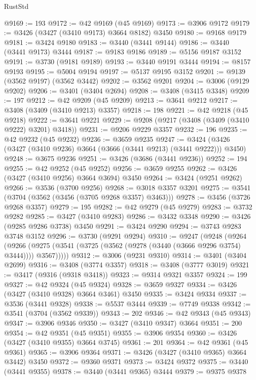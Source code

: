 \begin{lexlean}{RustStd}
\begin{coremodule}
@9169 := 193
@9172 := @42 @9169 (@45 @9169)
@9173 := @3906 @9172
@9179 := @3426 (@3427 (@3410 @9173) @3664 @8182) @3450
@9180 := @9168 @9179
@9181 := @3424 @9180
@9183 := @3440 (@3441 @9144)
@9186 := @3440 (@3441 @9173) @3444
@9187 := @9183 @9186
@9189 := @5156 @9187 @3152
@9191 := @3730 (@9181 @9189)
@9193 := @3440 @9191 @3444
@9194 := @8157 @9193
@9195 := @5004 @9194
@9197 := @5137 @9195 @3152
@9201 := @9139 (@3562 @9197) (@3562 @3442)
@9202 := @3562 @9201
@9204 := @3006 (@9129 @9202)
@9206 := @3401 (@3404 @2694)
@9208 := @3408 (@3415 @3348)
@9209 := 197
@9212 := @42 @9209 (@45 @9209)
@9213 := @3641 @9212
@9217 := @3408 (@3409 (@3410 @9213) @3357)
@9218 := 198
@9221 := @42 @9218 (@45 @9218)
@9222 := @3641 @9221
@9229 := @9208 (@9217 (@3408 (@3409 (@3410 @9222) @3201) @3418))
@9231 := @9206 @9229 @3357
@9232 := 196
@9235 := @42 @9232 (@45 @9232)
@9236 := @3659 @9235
@9247 := @3424 (@3426 (@3427 (@3410 @9236) @3664 (@3666 (@3441 @9213) (@3441 @9222))) @3450)
@9248 := @3675 @9236
@9251 := @3426 (@3686 (@3441 @9236))
@9252 := 194
@9255 := @42 @9252 (@45 @9252)
@9256 := @3659 @9255
@9262 := @3426 (@3427 (@3410 @9256) @3664 @3694) @3450
@9264 := @3424 (@9251 @9262)
@9266 := @3536 (@3700 @9256)
@9268 := @3018 @3357 @3201
@9275 := @3541 (@3704 (@3562 (@3456 (@3705 @9268 @3357) @3463)))
@9278 := @3456 (@3726 @9268 @3357)
@9279 := 195
@9282 := @42 @9279 (@45 @9279)
@9283 := @3732 @9282
@9285 := @3427 (@3410 @9283)
@9286 := @3432 @3348
@9290 := @3426 (@9285 @9286 @3738) @3450
@9291 := @3424 @9290
@9294 := @3743 @9283 @3748 @3152
@9296 := @3730 (@9291 @9294)
@9310 := @9247
    (@9248
      (@9264
        (@9266 (@9275 (@3541 (@3725 (@3562 (@9278 (@3440 (@3666 @9296 @3754) @3444)))) @3567)))))
@9312 := @3006 (@9231 @9310)
@9314 := @3401 (@3404 @2699)
@9316 := @3408 (@3774 @3357)
@9318 := @3408 (@3777 @3019)
@9321 := @3417 (@9316 (@9318 @3418))
@9323 := @9314 @9321 @3357
@9324 := 199
@9327 := @42 @9324 (@45 @9324)
@9328 := @3659 @9327
@9334 := @3426 (@3427 (@3410 @9328) @3664 @3461) @3450
@9335 := @3424 @9334
@9337 := @3536 (@3441 @9328)
@9338 := @5537 @3444
@9339 := @7749 @9338
@9342 := @3541 (@3704 (@3562 @9339))
@9343 := 202
@9346 := @42 @9343 (@45 @9343)
@9347 := @3906 @9346
@9350 := @3427 (@3410 @9347) @3664
@9351 := 200
@9354 := @42 @9351 (@45 @9351)
@9355 := @3906 @9354
@9360 := @3426 (@3427 (@3410 @9355) @3664 @3745)
@9361 := 201
@9364 := @42 @9361 (@45 @9361)
@9365 := @3906 @9364
@9371 := @3426 (@3427 (@3410 @9365) @3664 @3442) @3450
@9372 := @9360 @9371
@9373 := @3424 @9372
@9375 := @3440 (@3441 @9355)
@9378 := @3440 (@3441 @9365) @3444
@9379 := @9375 @9378

\end{coremodule}
\end{lexlean}
